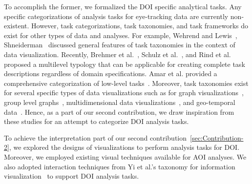 To accomplish the former, we formalized the DOI specific analytical tasks. Any specific categorizations of analysis tasks for eye-tracking data are currently non-existent. However, task categorizations, task taxonomies, and task frameworks do exist for other types of data and analyses. For example, Wehrend and Lewis~\cite{Weh90}, Shneiderman~\cite{Shne96} discussed general features of task taxonomies in the context of data visualization. Recently, Brehmer et al.~\cite{Bre13}, Schulz et al.~\cite{Sch13}, and Rind et al.~\cite{Rind15} proposed a multilevel typology that can be applicable for creating complete task descriptions regardless of domain specifications. Amar et al. provided a comprehensive categorization of low-level tasks~\cite{Ama05}. Moreover, task taxonomies exist for several specific types of data visualizations such as for graph visualizations~\cite{Lee06}, group level graphs~\cite{Sak14}, multidimensional data visualizations~\cite{Ward02}, and geo-temporal data~\cite{And03, Roth13}. Hence, as a part of our second contribution, we draw inspiration from these studies for an attempt to categorize DOI analysis tasks. 

To achieve the interpretation part of our second contribution~\ref{sec:Contribution-2}, we explored the designs of visualizations to perform analysis tasks for DOI. Moreover, we employed existing visual techniques available for AOI analyses. We also adopted interaction techniques from Yi et al.'s taxonomy for information visualization~\cite{Yi07} to support DOI analysis tasks.  
